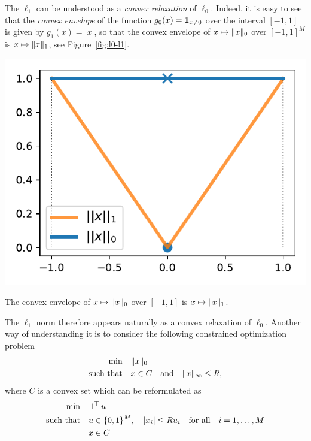 The $\ell_1$ can be understood as a \emph{convex relaxation} of $\ell_0$.
Indeed, it is easy to see that the \emph{convex envelope}%
of the function $g_0(x) = \mathbf 1_{x \neq 0}$ over the interval $[-1, 1]$ is given by $g_1(x) = |x|$, so that the convex envelope of $x \mapsto \| x \|_0$ over $[-1, 1]^M$ is $x \mapsto \| x \|_1$, see Figure~\ref{fig:l0-l1}.
\begin{marginfigure}
	\includegraphics{assets/l0_l1.pdf}
	\caption{The convex envelope of $x \mapsto \| x \|_0$ over $[-1, 1]$ is $x \mapsto \| x \|_1$.}
	\label{fig:l0-l1}
\end{marginfigure}
The $\ell_1$ norm therefore appears naturally as a convex relaxation of $\ell_0$.
Another way of understanding it is to consider the following constrained optimization problem
\begin{align*}
	\min \quad &\| x \|_0 \\ 
	\text{such that} \quad &x \in C \quad \text{and} \quad \| x \|_\infty \leq R,
\end{align*}
where $C$ is a convex set%
which can be reformulated as
\begin{align*}
	\min \quad &\operatorname{\boldsymbol 1}^\top u \\ 
	\text{such that} \quad &u \in \{ 0, 1 \}^M, \quad |x_i| \leq R u_i 
	\quad \text{for all} \quad i=1, \ldots, M \\
	&x \in C
\end{align*}
